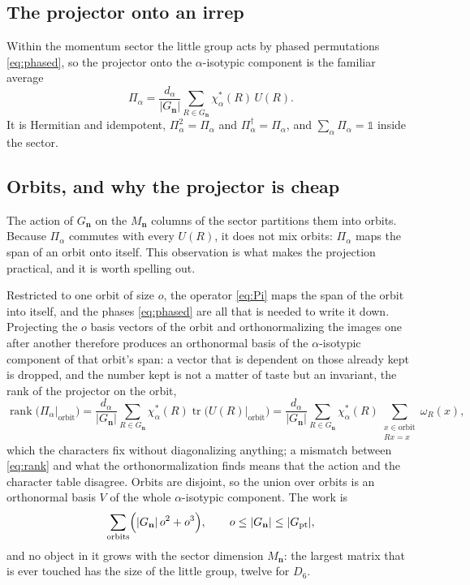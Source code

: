 \documentclass[12pt]{article}
\newcommand{\Gpt}{G_{\mathrm{pt}}}
\newcommand{\Gk}{G_{\mathbf{n}}}
\begin{document}
\subsection{The projector onto an irrep}

Within the momentum sector the little group acts by phased permutations
\eqref{eq:phased}, so the projector onto the $\alpha$-isotypic component is the
familiar average
\begin{equation}
  \Pi_{\alpha} = \frac{d_\alpha}{|\Gk|}\sum_{R\in\Gk}
  \chi_\alpha^{*}(R)\,U(R).
  \label{eq:Pi}
\end{equation}
It is Hermitian and idempotent, $\Pi_\alpha^2 = \Pi_\alpha$ and
$\Pi_\alpha^{\dagger} = \Pi_\alpha$, and $\sum_\alpha \Pi_\alpha = \mathbb{1}$
inside the sector.

\subsection{Orbits, and why the projector is cheap}

The action of $\Gk$ on the $M_{\mathbf{n}}$ columns of the sector partitions them
into orbits. Because $\Pi_\alpha$ commutes with every $U(R)$, it does not mix
orbits: $\Pi_\alpha$ maps the span of an orbit onto itself. This observation is
what makes the projection practical, and it is worth spelling out.

Restricted to one orbit of size $o$, the operator \eqref{eq:Pi} maps the span of
the orbit into itself, and the phases \eqref{eq:phased} are all that is needed to
write it down. Projecting the $o$ basis vectors of the orbit and orthonormalizing
the images one after another therefore produces an orthonormal basis of the
$\alpha$-isotypic component of that orbit's span: a vector that is dependent on
those already kept is dropped, and the number kept is not a matter of taste but
an invariant, the rank of the projector on the orbit,
\begin{equation}
  \operatorname{rank}\bigl(\Pi_\alpha\big|_{\text{orbit}}\bigr)
  = \frac{d_\alpha}{|\Gk|}\sum_{R\in\Gk}\chi_\alpha^{*}(R)
    \operatorname{tr}\bigl(U(R)\big|_{\text{orbit}}\bigr)
  = \frac{d_\alpha}{|\Gk|}\sum_{R\in\Gk}\chi_\alpha^{*}(R)
    \sum_{\substack{x \in \text{orbit}\\ R x = x}} \omega_R(x) ,
  \label{eq:rank}
\end{equation}
which the characters fix without diagonalizing anything; a mismatch between
\eqref{eq:rank} and what the orthonormalization finds means that the action and
the character table disagree. Orbits are disjoint, so the union over orbits is an
orthonormal basis $V$ of the whole $\alpha$-isotypic component. The work is
\begin{equation}
  \sum_{\text{orbits}}\Bigl(|\Gk|\,o^{2} + o^{3}\Bigr), \qquad o \le |\Gk| \le |\Gpt| ,
\end{equation}
and no object in it grows with the sector dimension $M_{\mathbf{n}}$: the largest
matrix that is ever touched has the size of the little group, twelve for $D_6$.
\end{document}
